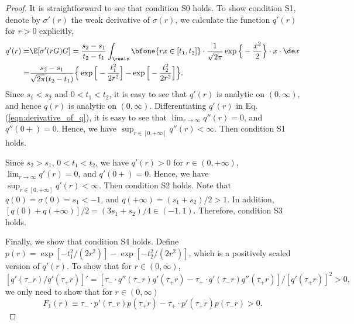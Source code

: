 \documentclass[11pt]{article}
\begin{document}
\begin{proof}


It is straightforward to see that condition {\sf S0} holds. To show condition {\sf S1}, denote by $\sigma'(r)$ the weak derivative of $\sigma(r)$, we calculate the function $q'(r)$ for $r > 0$ explicitly, 
\begin{equation}\label{eqn:derivative_of_q}
\begin{aligned}
q'(r) =& \E[\sigma'( r G) G] = \frac{s_2 - s_1}{t_2 - t_1} \int_\reals \bfone\{ r x \in [t_1, t_2] \} \cdot \frac{1}{\sqrt{2 \pi}} \exp \Big\{ - \frac{x^2}{2} \Big\} \cdot x \cdot \de x\\
=& \frac{s_2 - s_1}{\sqrt{2 \pi} (t_2 - t_1)} \Big\{\exp\Big[- \frac{t_1^2 }{ 2  r^2}\Big] - \exp\Big[- \frac{t_2^2}{2 r^2}\Big]\Big\}.
\end{aligned}
\end{equation}
Since $s_1 < s_2 $ and $0 < t_1 < t_2$, it is easy to see that $q'(r)$ is analytic on $(0,\infty)$, and hence $q(r)$ is analytic on $(0,\infty)$. Differentiating $q'(r)$ in Eq. (\ref{eqn:derivative_of_q}), it is easy to see that $\lim_{r\rightarrow \infty} q''(r) = 0$, and $q''(0 +) = 0$. Hence, we have $\sup_{r \in [0, +\infty]} q''(r) < \infty$. Then condition {\sf S1} holds. 

Since $s_2 > s_1$, $0 <  t_1 < t_2$, we have $q'(r) > 0$ for $r \in (0, +\infty)$, $\lim_{r\rightarrow \infty} q'(r) = 0$, and $q'(0 +) = 0$. Hence, we have $\sup_{r \in [0, +\infty]} q'(r) < \infty$. Then condition {\sf S2} holds. Note that $q(0) = \sigma(0) = s_1  < -1$, and $q(+\infty) = (s_1 + s_2) / 2 > 1$. In addition, $[q(0) + q(+\infty)]/2 = (3 s_1 + s_2)/4 \in (-1, 1)$. Therefore, condition {\sf S3} holds. 

Finally, we show that condition {\sf S4} holds. Define $p(r) = \exp[- t_1^2 / (2 r^2)] - \exp[- t_2^2 / (2 r^2)]$, which is a positively scaled version of $q'(r)$. To show that for $r \in (0, \infty)$, 
\[
[q'(\tau_- r)/q'(\tau_+ r)]' = [\tau_- \cdot q''(\tau_- r) q'(\tau_+ r) - \tau_+ \cdot q'(\tau_- r) q''(\tau_+ r)] / [q'(\tau_+ r)]^2> 0,
\]
we only need to show that for $r \in (0, \infty)$
\[
F_1(r) \equiv \tau_- \cdot p'(\tau_- r) p(\tau_+ r) - \tau_+ \cdot p'(\tau_+ r) p(\tau_- r) > 0. 
\]


\end{proof}
\end{document}
